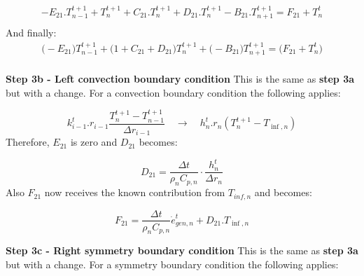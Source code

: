\documentclass[11pt,letterpaper,titlepage]{article}
\begin{document}
\begin{equation*}
\begin{aligned}
-E_{21}.T_{n-1}^{t+1} 
+ T_n^{t+1} + C_{21}.T_{n}^{t+1} + D_{21}.T_{n}^{t+1}
-B_{21}.T_{n+1}^{t+1}
=F_{21} + T_n^t \\
\end{aligned}
\end{equation*}
\newline
And finally:
\begin{equation}
\begin{aligned}
\biggr( -E_{21} \biggr)T_{n-1}^{t+1}
+ \biggr(1 + C_{21} + D_{21} \biggr) T_{n}^{t+1}
+ \biggr( -B_{21} \biggr)T_{n+1}^{t+1}
=\biggr( F_{21} + T_n^t \biggr) \\
\end{aligned}
\end{equation}







\vspace{0.5cm}\noindent
\textbf{Step 3b - Left convection boundary condition}\newline
This is the same as \textbf{step 3a} but with a change. For a convection boundary condition the following applies:

\begin{equation*}
k_{i-1}^t.r_{i-1} \frac{T_{n}^{t+1} - T_{n-1}^{t+1}}{\Delta r_{i-1}} \quad \to \quad h_n^t.r_n (T_{n}^{t+1}-T_{\inf,n})
\end{equation*}
\newline
Therefore, $E_{21}$ is zero and $D_{21}$ becomes:

\begin{equation*}
D_{21}=\frac{\Delta t}{\rho_n C_{p,n}} \cdot \frac{h_n^t}{\Delta r_n}
\end{equation*}
\newline 
Also $F_{21}$ now receives the known contribution from $T_{inf,n}$ and becomes:

\begin{equation*}
F_{21}=\frac{\Delta t}{\rho_n C_{p,n}} \dot{e}_{gen,n}^t + D_{21}.T_{\inf,n}
\end{equation*}




\vspace{0.5cm}\noindent
\textbf{Step 3c - Right symmetry boundary condition}\newline
This is the same as \textbf{step 3a} but with a change. For a symmetry boundary condition the following applies:
\end{document}
